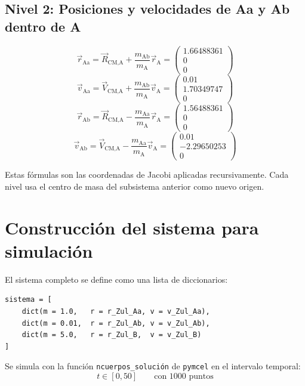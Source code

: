 \documentclass[12pt,oneside]{book}
\begin{document}
\subsection{Nivel 2: Posiciones y velocidades de Aa y Ab dentro de A}
\[
\vec{r}_{\text{Aa}} = \vec{R}_{\text{CM,A}} + \frac{m_{\text{Ab}}}{m_{\text{A}}} \vec{r}_{\text{A}} = \begin{pmatrix} 1.66488361 \\ 0 \\ 0 \end{pmatrix}
\]
\[
\vec{v}_{\text{Aa}} = \vec{V}_{\text{CM,A}} + \frac{m_{\text{Ab}}}{m_{\text{A}}} \vec{v}_{\text{A}} = \begin{pmatrix} 0.01 \\ 1.70349747 \\ 0 \end{pmatrix}
\]
\[
\vec{r}_{\text{Ab}} = \vec{R}_{\text{CM,A}} - \frac{m_{\text{Aa}}}{m_{\text{A}}} \vec{r}_{\text{A}} = \begin{pmatrix} 1.56488361 \\ 0 \\ 0 \end{pmatrix}
\]
\[
\vec{v}_{\text{Ab}} = \vec{V}_{\text{CM,A}} - \frac{m_{\text{Aa}}}{m_{\text{A}}} \vec{v}_{\text{A}} = \begin{pmatrix} 0.01 \\ -2.29650253 \\ 0 \end{pmatrix}
\]

\begin{importante}
Estas fórmulas son las coordenadas de Jacobi aplicadas recursivamente. Cada nivel usa el centro de masa del subsistema anterior como nuevo origen.
\end{importante}

\section{Construcción del sistema para simulación}
El sistema completo se define como una lista de diccionarios:
\begin{lstlisting}
sistema = [
    dict(m = 1.0,   r = r_Zul_Aa, v = v_Zul_Aa),
    dict(m = 0.01,  r = r_Zul_Ab, v = v_Zul_Ab),
    dict(m = 5.0,   r = r_Zul_B,  v = v_Zul_B)
]
\end{lstlisting}

Se simula con la función \texttt{ncuerpos\_solución} de \texttt{pymcel} en el intervalo temporal:
\[
t \in [0, 50]\qquad \text{con 1000 puntos}
\]
\end{document}
